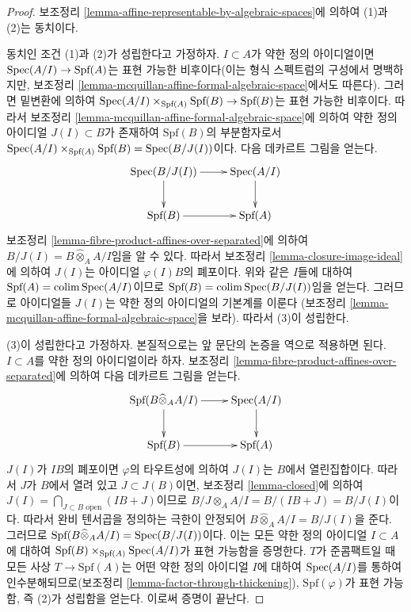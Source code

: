 \begin{proof}
보조정리 \ref{lemma-affine-representable-by-algebraic-spaces}에 의하여
(1)과 (2)는 동치이다.

\medskip\noindent
동치인 조건 (1)과 (2)가 성립한다고 가정하자. $I \subset A$가
약한 정의 아이디얼이면 $\mathop{\mathrm{Spec}}(A/I) \to \text{Spf}(A)$는 표현
가능한 비후이다(이는 형식 스펙트럼의 구성에서 명백하지만,
보조정리 \ref{lemma-mcquillan-affine-formal-algebraic-space}에서도
따른다). 그러면 밑변환에 의하여
$\mathop{\mathrm{Spec}}(A/I) \times_{\text{Spf}(A)} \text{Spf}(B) \to \text{Spf}(B)$는
표현 가능한 비후이다. 따라서 보조정리
\ref{lemma-mcquillan-affine-formal-algebraic-space}에 의하여
약한 정의 아이디얼 $J(I) \subset B$가 존재하여
$\text{Spf}(B)$의 부분함자로서
$\mathop{\mathrm{Spec}}(A/I) \times_{\text{Spf}(A)} \text{Spf}(B) = \mathop{\mathrm{Spec}}(B/J(I))$이다.
다음 데카르트 그림을 얻는다.
$$
\xymatrix{
\Spec(B/J(I)) \ar[d] \ar[r] & \Spec(A/I) \ar[d] \\
\text{Spf}(B) \ar[r] & \text{Spf}(A)
}
$$
보조정리 \ref{lemma-fibre-product-affines-over-separated}에 의하여
$B/J(I) = B \widehat{\otimes}_A A/I$임을 알 수 있다.
따라서 보조정리 \ref{lemma-closure-image-ideal}에 의하여 $J(I)$는
아이디얼 $\varphi(I)B$의 폐포이다.
위와 같은 $I$들에 대하여
$\text{Spf}(A) = \mathop{\mathrm{colim}}\nolimits \mathop{\mathrm{Spec}}(A/I)$이므로
$\text{Spf}(B) = \mathop{\mathrm{colim}}\nolimits \mathop{\mathrm{Spec}}(B/J(I))$임을 얻는다.
그러므로 아이디얼들 $J(I)$는 약한 정의 아이디얼의 기본계를 이룬다
(보조정리 \ref{lemma-mcquillan-affine-formal-algebraic-space}을 보라).
따라서 (3)이 성립한다.

\medskip\noindent
(3)이 성립한다고 가정하자. 본질적으로는 앞 문단의 논증을
역으로 적용하면 된다. $I \subset A$를 약한 정의 아이디얼이라 하자.
보조정리 \ref{lemma-fibre-product-affines-over-separated}에 의하여
다음 데카르트 그림을 얻는다.
$$
\xymatrix{
\text{Spf}(B \widehat{\otimes}_A A/I) \ar[d] \ar[r] & \Spec(A/I) \ar[d] \\
\text{Spf}(B) \ar[r] & \text{Spf}(A)
}
$$
$J(I)$가 $IB$의 폐포이면 $\varphi$의 타우트성에 의하여 $J(I)$는
$B$에서 열린집합이다. 따라서 $J$가 $B$에서 열려 있고
$J \subset J(B)$이면, %
보조정리 \ref{lemma-closed}에 의하여
$J(I) = \bigcap_{J \subset B\text{ open}} (IB + J)$이므로
$B/J \otimes_A A/I = B/(IB + J) = B/J(I)$이다.
따라서 완비 텐서곱을 정의하는 극한이 안정되어
$B \widehat{\otimes}_A A/I = B/J(I)$을 준다.
그러므로
$\text{Spf}(B \widehat{\otimes}_A A/I) = \mathop{\mathrm{Spec}}(B/J(I))$이다.
이는 모든 약한 정의 아이디얼 $I \subset A$에 대하여
$\text{Spf}(B) \times_{\text{Spf}(A)} \mathop{\mathrm{Spec}}(A/I)$가 표현 가능함을
증명한다. $T$가 준콤팩트일 때 모든 사상
$T \to \text{Spf}(A)$는 어떤 약한 정의 아이디얼 $I$에 대하여
$\mathop{\mathrm{Spec}}(A/I)$를 통하여 인수분해되므로(보조정리
\ref{lemma-factor-through-thickening}),
$\text{Spf}(\varphi)$가 표현 가능함, 즉 (2)가 성립함을 얻는다.
이로써 증명이 끝난다.
\end{proof}

